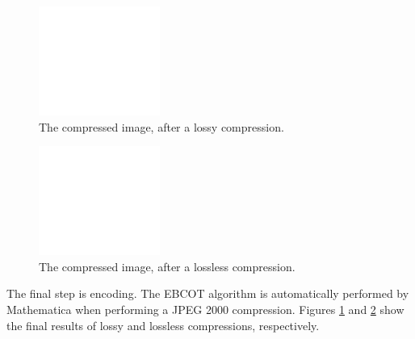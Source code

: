 \documentclass[titlepage,12pt]{article}
\begin{document}
\begin{figure}
	\centering
	\includegraphics{resources/finalLossyBaby.png}
	\caption{The compressed image, after a lossy compression.}
	\label{fig:finalLossyBaby}
\end{figure}
\begin{figure}
	\centering
	\includegraphics{resources/finalLosslessBaby.png}
	\caption{The compressed image, after a lossless compression.}
	\label{fig:finalLosslessBaby}
\end{figure}

The final step is encoding.
The EBCOT algorithm is automatically performed by Mathematica 
when performing a JPEG 2000 compression.
Figures \ref{fig:finalLossyBaby} and \ref{fig:finalLosslessBaby} 
show the final results of lossy and lossless compressions, respectively.
\end{document}

